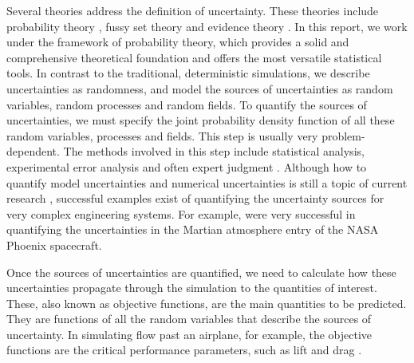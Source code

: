 Several theories address the definition of uncertainty.
These theories include probability theory \cite[]{design1} \cite[]{probability},
fussy set theory \cite[]{fuzzy} and evidence theory \cite[]{evidence1}
\cite[]{evidence2}.
In this report, we work under the framework of probability theory,
which provides a solid and comprehensive theoretical foundation and offers
the most versatile statistical tools.
In contrast to the traditional, deterministic simulations,
we describe uncertainties as randomness, and model the sources
of uncertainties as random variables, random processes and random fields.
To quantify the sources of uncertainties, we must specify the joint probability
density function of all these random variables, processes and fields.
This step is usually very problem-dependent.  The methods involved in this
step include
statistical analysis, experimental error analysis and often expert judgment
\cite[]{sources}.
Although how to quantify model uncertainties and numerical uncertainties
is still a topic of current research \cite[]{modeluq1} \cite[]{modeluq2},
successful examples exist of quantifying the uncertainty sources for
very complex engineering systems.
For example, \cite{mars_entry} were very successful
in quantifying the uncertainties in the Martian atmosphere entry of the
NASA Phoenix spacecraft.

Once the sources of uncertainties are quantified, we need to calculate how
these uncertainties propagate through the simulation to the
quantities of interest.  These, also known as objective functions,
are the main quantities to be predicted.  They are functions
of all the random variables that describe the sources of uncertainty.
In simulating flow
past an airplane, for example, the objective functions are the
critical performance parameters, such as lift and drag \cite[]{overall}.

